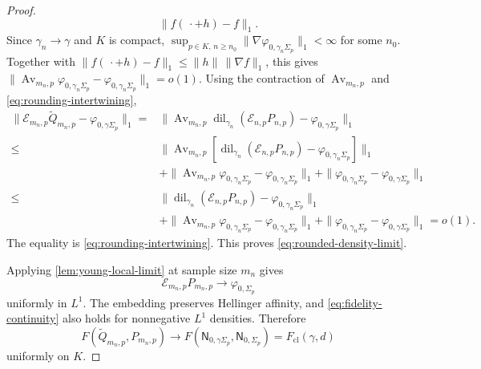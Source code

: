 \documentclass[11pt]{article}
\theoremstyle{remark}
\theoremstyle{plain}
\newcommand{\Fcl}{F_{\mathrm{cl}}}
\begin{document}
\begin{proof}
\[       \|f(\,\cdot+h)-f\|_1.
\]
Since \(\gamma_n\to\gamma\) and \(K\) is compact,
\(\sup_{p\in K,\,n\ge n_0}
\|\nabla\varphi_{0,\gamma_n\Sigma_p}\|_1<\infty\) for some \(n_0\).
Together with
\(\|f(\,\cdot+h)-f\|_1\le\|h\|\,\|\nabla f\|_1\), this gives
\(\|\operatorname{Av}_{m_n,p}\varphi_{0,\gamma_n\Sigma_p}
-\varphi_{0,\gamma_n\Sigma_p}\|_1=o(1)\).  Using the contraction of
\(\operatorname{Av}_{m_n,p}\) and \eqref{eq:rounding-intertwining},
\[
\begin{aligned}
  \|\mathcal E_{m_n,p}\widetilde Q_{m_n,p}
       -\varphi_{0,\gamma\Sigma_p}\|_1
  ={}&\|\operatorname{Av}_{m_n,p}\operatorname{dil}_{\gamma_n}
       (\mathcal E_{n,p}P_{n,p})
       -\varphi_{0,\gamma\Sigma_p}\|_1\\
  \le{}&\|\operatorname{Av}_{m_n,p}
       [\operatorname{dil}_{\gamma_n}(\mathcal E_{n,p}P_{n,p})
       -\varphi_{0,\gamma_n\Sigma_p}]\|_1\\
  &+\|\operatorname{Av}_{m_n,p}\varphi_{0,\gamma_n\Sigma_p}
       -\varphi_{0,\gamma_n\Sigma_p}\|_1
   +\|\varphi_{0,\gamma_n\Sigma_p}
       -\varphi_{0,\gamma\Sigma_p}\|_1\\
  \le{}&\|\operatorname{dil}_{\gamma_n}(\mathcal E_{n,p}P_{n,p})
       -\varphi_{0,\gamma_n\Sigma_p}\|_1\\
  &+\|\operatorname{Av}_{m_n,p}\varphi_{0,\gamma_n\Sigma_p}
       -\varphi_{0,\gamma_n\Sigma_p}\|_1
   +\|\varphi_{0,\gamma_n\Sigma_p}
       -\varphi_{0,\gamma\Sigma_p}\|_1=o(1).
\end{aligned}
\]
The equality is \eqref{eq:rounding-intertwining}.
This proves \eqref{eq:rounded-density-limit}.

Applying \cref{lem:young-local-limit} at sample size \(m_n\) gives
\[
  \mathcal E_{m_n,p}P_{m_n,p}\longrightarrow\varphi_{0,\Sigma_p}
\]
uniformly in \(L^1\).  The embedding preserves Hellinger affinity, and
\eqref{eq:fidelity-continuity} also holds for nonnegative \(L^1\) densities.
Therefore
\[
  F(\widetilde Q_{m_n,p},P_{m_n,p})
  \longrightarrow
  F(\mathsf N_{0,\gamma\Sigma_p},\mathsf N_{0,\Sigma_p})
  =\Fcl(\gamma,d)
\]
uniformly on \(K\).
\end{proof}
\end{document}
